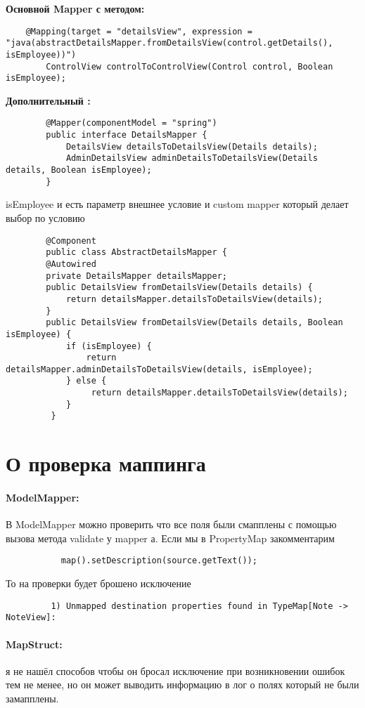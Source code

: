 \documentclass{article}
\begin{document}
   \textbf{Основной Mapper с методом:} 
    \begin{lstlisting} 
    @Mapping(target = "detailsView", expression = "java(abstractDetailsMapper.fromDetailsView(control.getDetails(), isEmployee))")
        ControlView controlToControlView(Control control, Boolean isEmployee);
     \end{lstlisting}
    \textbf{Дополнительный :} 
     \begin{lstlisting} 
        @Mapper(componentModel = "spring")
        public interface DetailsMapper {
            DetailsView detailsToDetailsView(Details details);
            AdminDetailsView adminDetailsToDetailsView(Details details, Boolean isEmployee);
        }
         \end{lstlisting}
         isEmployee и есть параметр внешнее условие
         и custom mapper который делает выбор по условию
         \begin{lstlisting} 
        @Component
        public class AbstractDetailsMapper {
        @Autowired
        private DetailsMapper detailsMapper;
        public DetailsView fromDetailsView(Details details) {
            return detailsMapper.detailsToDetailsView(details);
        }
        public DetailsView fromDetailsView(Details details, Boolean isEmployee) {
            if (isEmployee) {
                return detailsMapper.adminDetailsToDetailsView(details, isEmployee);
            } else {
                 return detailsMapper.detailsToDetailsView(details);
            }               
         }
         \end{lstlisting}
  \section{О проверка маппинга} 
  
   \paragraph{ModelMapper:}      
         В ModelMapper можно проверить что все поля были смапплены с помощью вызова метода validate у mapper а.       
         Если мы в PropertyMap  закомментарим
         \begin{lstlisting}     
           map().setDescription(source.getText()); 
          \end{lstlisting}        
         То на проверки будет брошено исключение    
          \begin{lstlisting}      
         1) Unmapped destination properties found in TypeMap[Note -> NoteView]:
          \end{lstlisting}
    \paragraph{MapStruct:}   я не нашёл способов чтобы он бросал исключение при возникновении ошибок тем не менее, но он может выводить информацию в лог о полях который не были замапплены. 
\end{document}
